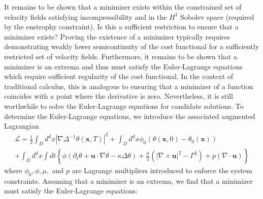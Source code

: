 It remains to be shown that a minimizer exists within the constrained set of velocity fields satisfying incompressibility and in the $H^1$ Sobolev space (required by the enstrophy constraint).  Is this a sufficient restriction to ensure that a minimizer exists? Proving the existence of a minimizer typically requires demonstrating weakly lower semicontinuity of the cost functional for a sufficiently restricted set of velocity fields. Furthermore, it remains to be shown that a minimizer is an extrema and thus must satisfy the Euler-Lagrange equations which require sufficient regularity of the cost functional. In the context of traditional calculus, this is analogous to ensuring that a minimizer of a function coincides with a point where the derivative is zero. Nevertheless, it is still worthwhile to solve the Euler-Lagrange equations for candidate solutions. To determine the Euler-Lagrange equations, we introduce the associated augmented Lagrangian
\begin{multline}
	\label{eq:PDE_lagrangian}
	\mathcal{L} = \frac{1}{2}\int_{D}d^{d}x |\nabla\Delta^{-1} \theta(\mathbf{x},T)|^{2}  +  \int_{D}d^{d}x \phi_0 (\theta(\mathbf{x},0)-\theta_0(\mathbf{x})) \\
	+ \int_{D} d^{d}x \int dt \left\{ \phi(\partial_{t}\theta+\mathbf{u}\cdot\nabla \theta - \kappa\Delta \theta) +\frac{\mu}{2} (|\nabla \times\mathbf{u}|^{2}- \Gamma^2) + p(\nabla\cdot \mathbf{u})
	\right \} 
\end{multline}
where $\phi_0, \phi, \mu, $ and $p$ are Lagrange multipliers introduced to enforce the system constraints. Assuming that a minimizer is an extrema, we find that a minimizer must satisfy the Euler-Lagrange equations:
